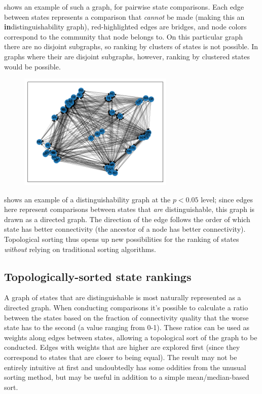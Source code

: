 shows an example of such a graph, for pairwise state comparisons. Each edge between states represents a comparison that \textit{cannot} be made (making this an \textbf{in}distinguish\-ability graph), red-highlighted edges are bridges, and node colors correspond to the community that node belongs to. On this particular graph there are no disjoint subgraphs, so ranking by clusters of states is not possible. In graphs where their are disjoint subgraphs, however, ranking by clustered states would be possible.

\begin{figure}[h]
    \centering
    \includegraphics[width=0.66\textwidth]{images/caida/caida_network_valid_comps.png}
\end{figure}

 shows an example of a distinguishability graph at the $p<0.05$ level; since edges here represent comparisons between states that \textit{are} distinguishable, this graph is drawn as a directed graph. The direction of the edge follows the order of which state has better connectivity (the ancestor of a node has better connectivity). Topological sorting thus opens up new possibilities for the ranking of states \textit{without} relying on traditional sorting algorithms.

\subsection{Topologically-sorted state rankings}\label{sec:methods_stats_topological_rankings}

A graph of states that are distinguishable is most naturally represented as a directed graph. When conducting comparisons it's possible to calculate a ratio between the states based on the fraction of connectivity quality that the worse state has to the second (a value ranging from 0-1). These ratios can be used as weights along edges between states, allowing a topological sort of the graph to be conducted. Edges with weights that are higher are explored first (since they correspond to states that are closer to being equal). The result may not be entirely intuitive at first and undoubtedly has some oddities from the unusual sorting method, but may be useful in addition to a simple mean/median-based sort.

